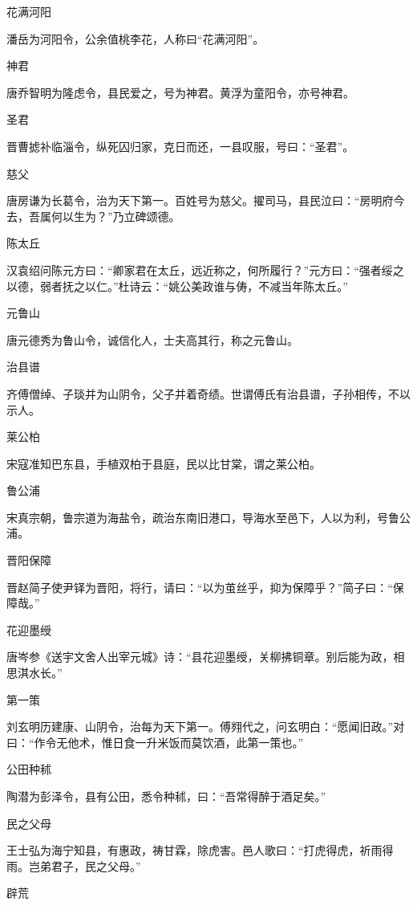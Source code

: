 \documentclass[a4paper,12pt,UTF8,twoside]{ctexbook}
\begin{document}
    花满河阳
    
    潘岳为河阳令，公余值桃李花，人称曰“花满河阳”。
    
    神君
    
    唐乔智明为隆虑令，县民爱之，号为神君。黄浮为童阳令，亦号神君。
    
    圣君
    
    晋曹摅补临淄令，纵死囚归家，克日而还，一县叹服，号曰：“圣君”。
    
    慈父
    
    唐房谦为长葛令，治为天下第一。百姓号为慈父。擢司马，县民泣曰：“房明府今去，吾属何以生为？”乃立碑颂德。
    
    陈太丘
    
    汉袁绍问陈元方曰：“卿家君在太丘，远近称之，何所履行？”元方曰：“强者绥之以德，弱者抚之以仁。”杜诗云：“姚公美政谁与俦，不减当年陈太丘。”
    
    元鲁山
    
    唐元德秀为鲁山令，诚信化人，士夫高其行，称之元鲁山。
    
    治县谱
    
    齐傅僧绰、子琰并为山阴令，父子并着奇绩。世谓傅氏有治县谱，子孙相传，不以示人。
    
    莱公柏
    
    宋寇准知巴东县，手植双柏于县庭，民以比甘棠，谓之莱公柏。
    
    鲁公浦
    
    宋真宗朝，鲁宗道为海盐令，疏治东南旧港口，导海水至邑下，人以为利，号鲁公浦。
    
    晋阳保障
    
    晋赵简子使尹铎为晋阳，将行，请曰：“以为茧丝乎，抑为保障乎？”简子曰：“保障哉。”
    
    花迎墨绶
    
    唐岑参《送宇文舍人出宰元城》诗：“县花迎墨绶，关柳拂铜章。别后能为政，相思淇水长。”
    
    第一策
    
    刘玄明历建康、山阴令，治每为天下第一。傅翙代之，问玄明白：“愿闻旧政。”对曰：“作令无他术，惟日食一升米饭而莫饮酒，此第一策也。”
    
    公田种秫
    
    陶潜为彭泽令，县有公田，悉令种秫，曰：“吾常得醉于酒足矣。”
    
    民之父母
    
    王士弘为海宁知县，有惠政，祷甘霖，除虎害。邑人歌曰：“打虎得虎，祈雨得雨。岂弟君子，民之父母。”
    
    辟荒
    
\end{document}
